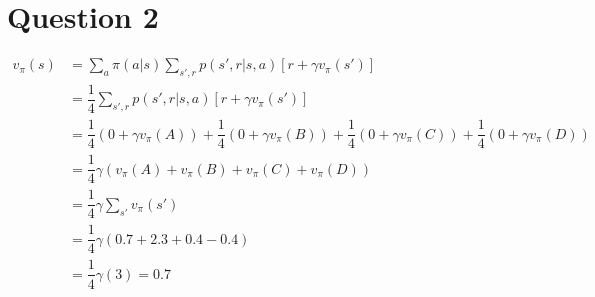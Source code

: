 \section{Question 2}
\begin{align*}  
v_{\pi}(s) &= \sum_{a} \pi(a|s) \sum_{s',r} p(s',r|s,a) [r + \gamma v_{\pi}(s')] \\
& = \dfrac{1}{4} \sum_{s',r} p(s',r|s,a) [r + \gamma v_{\pi}(s')] \\
& = \dfrac{1}{4} (0 + \gamma v_{\pi}(A)) + \dfrac{1}{4} (0 + \gamma v_{\pi}(B)) + \dfrac{1}{4} (0 + \gamma v_{\pi}(C)) + \dfrac{1}{4} (0 + \gamma v_{\pi}(D)) \\
& = \dfrac{1}{4} \gamma (v_{\pi}(A) + v_{\pi}(B) + v_{\pi}(C) + v_{\pi}(D)) \\
& = \dfrac{1}{4} \gamma \sum_{s'} v_{\pi}(s') \\
& = \dfrac{1}{4} \gamma (0.7 + 2.3 + 0.4 - 0.4)\\
& = \dfrac{1}{4} \gamma (3) = 0.7
\end{align*}